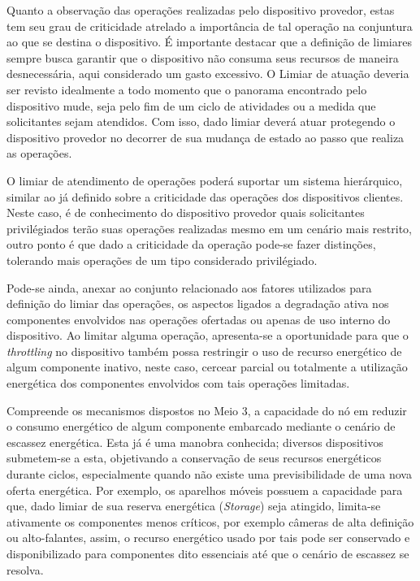 Quanto a observação das operações realizadas pelo dispositivo provedor, estas tem seu grau de criticidade atrelado a importância de tal operação na conjuntura ao que se destina o dispositivo. É importante destacar que a definição de limiares sempre busca garantir que o dispositivo não consuma seus recursos de maneira desnecessária, aqui considerado um gasto excessivo. O Limiar de atuação deveria ser revisto idealmente a todo momento que o panorama encontrado pelo dispositivo mude, seja pelo fim de um ciclo de atividades ou a medida que solicitantes sejam atendidos. Com isso, dado limiar deverá atuar protegendo o dispositivo provedor no decorrer de sua mudança de estado ao passo que realiza as operações. 

O limiar de atendimento de operações poderá suportar um sistema hierárquico, similar ao já definido sobre a criticidade das operações dos dispositivos clientes. Neste caso, é de conhecimento do dispositivo provedor quais solicitantes privilégiados terão suas operações realizadas mesmo em um cenário mais restrito, outro ponto é que dado a criticidade da operação pode-se fazer distinções, tolerando mais operações de um tipo considerado privilégiado.

Pode-se ainda, anexar ao conjunto relacionado aos fatores utilizados para definição do limiar das operações, os aspectos ligados a degradação ativa nos componentes envolvidos nas operações ofertadas ou apenas de uso interno do dispositivo. Ao limitar alguma operação, apresenta-se a oportunidade para que o \textit{throttling} no dispositivo também possa restringir o uso de recurso energético de algum componente inativo, neste caso, cercear parcial ou totalmente a utilização energética dos componentes envolvidos com tais operações limitadas. 

Compreende os mecanismos dispostos no Meio 3, a capacidade do nó em reduzir o consumo energético de algum componente embarcado mediante o cenário de escassez energética. Esta já é uma manobra conhecida; diversos dispositivos submetem-se a esta, objetivando a conservação de seus recursos energéticos durante ciclos, especialmente quando não existe uma previsibilidade de uma nova oferta energética. Por exemplo, os aparelhos móveis possuem a capacidade para que, dado limiar de  sua reserva energética (\textit{Storage}) seja atingido, limita-se ativamente os componentes menos críticos, por exemplo câmeras de alta definição ou alto-falantes, assim, o recurso energético usado por tais pode ser conservado e disponibilizado para componentes dito essenciais até que o cenário de escassez se resolva. 



